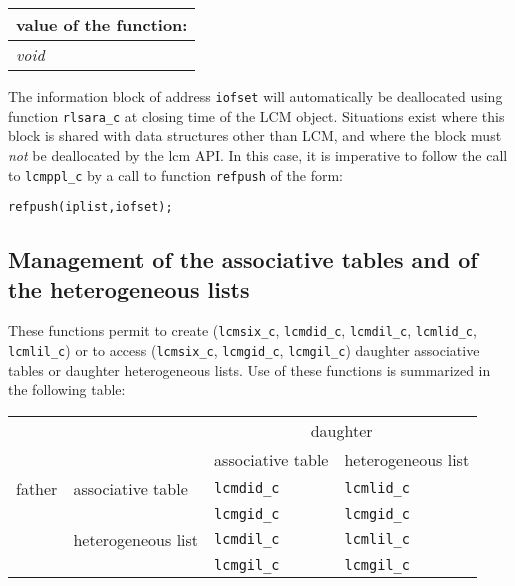 \vskip 0.8cm

\noindent
\begin{tabular}{|p{4.0cm}|p{11cm}|}
\hline
\multicolumn{2}{|c|}{\bf value of the function:} \\
\hline
{\it void} &  \\
\hline
\end{tabular}

\vskip 0.4cm

The information block of address {\tt iofset} will automatically be deallocated using function  {\tt rlsara\_c} 
at closing time of the LCM object. Situations exist where this block is shared with data structures other
than LCM, and where the block must {\sl not} be deallocated by the {\sc lcm} API. In this case, it is imperative
to follow the call to {\tt lcmppl\_c} by a call to function {\tt refpush} of the form:

\begin{verbatim}
refpush(iplist,iofset);
\end{verbatim}

\subsection{Management of the associative tables and of the heterogeneous lists}

These functions permit to create ({\tt lcmsix\_c}, {\tt lcmdid\_c}, {\tt lcmdil\_c},
{\tt lcmlid\_c}, {\tt lcmlil\_c}) or to access ({\tt lcmsix\_c}, {\tt lcmgid\_c}, {\tt lcmgil\_c})
daughter associative tables or daughter heterogeneous lists. Use of these functions is summarized in the following table:

\vskip 0.4cm

\begin{center}
\begin{tabular}{|c|l|l|l|}
\cline{3-4}
\multicolumn{2}{c|}{} & \multicolumn{2}{c|}{daughter} \\
\cline{3-4}
\multicolumn{2}{c|}{} & associative table & heterogeneous list \\
\hline
father & associative table & {\tt lcmdid\_c} & {\tt lcmlid\_c} \\
       &                   & {\tt lcmgid\_c} & {\tt lcmgid\_c} \\
\cline{2-4}
       &heterogeneous list & {\tt lcmdil\_c} & {\tt lcmlil\_c} \\
       &                   & {\tt lcmgil\_c} & {\tt lcmgil\_c} \\
\hline
\end{tabular}
\end{center}

